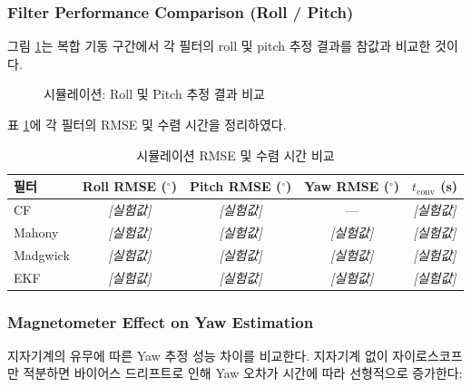         \subsubsection{Filter Performance Comparison (Roll / Pitch)}
            그림 \ref{fig:sim_roll_pitch}는 복합 기동 구간에서 각 필터의 roll 및 pitch 추정 결과를 참값과 비교한 것이다.\\

            \begin{figure}[H]
                \centering
                \caption{시뮬레이션: Roll 및 Pitch 추정 결과 비교}
                \label{fig:sim_roll_pitch}
            \end{figure}
            
            표 \ref{tab:sim_rmse}에 각 필터의 RMSE 및 수렴 시간을 정리하였다.\\
            
            \begin{table}[H]
                \centering
                \caption{시뮬레이션 RMSE 및 수렴 시간 비교}
                \label{tab:sim_rmse}
                \begin{tabular}{lcccc}
                    \toprule
                    필터 & Roll RMSE ($^\circ$) & Pitch RMSE ($^\circ$) & Yaw RMSE ($^\circ$) & $t_{\text{conv}}$ (s) \\
                    \midrule
                    CF        & \textit{[실험값]} & \textit{[실험값]} & --- & \textit{[실험값]} \\
                    Mahony    & \textit{[실험값]} & \textit{[실험값]} & \textit{[실험값]} & \textit{[실험값]} \\
                    Madgwick  & \textit{[실험값]} & \textit{[실험값]} & \textit{[실험값]} & \textit{[실험값]} \\
                    EKF       & \textit{[실험값]} & \textit{[실험값]} & \textit{[실험값]} & \textit{[실험값]} \\
                    \bottomrule
                \end{tabular}
            \end{table}

        \subsubsection{Magnetometer Effect on Yaw Estimation}
            지자기계의 유무에 따른 Yaw 추정 성능 차이를 비교한다. 지자기계 없이 자이로스코프만 적분하면 바이어스 드리프트로 인해 Yaw 오차가 시간에 따라 선형적으로 증가한다:\\
        
